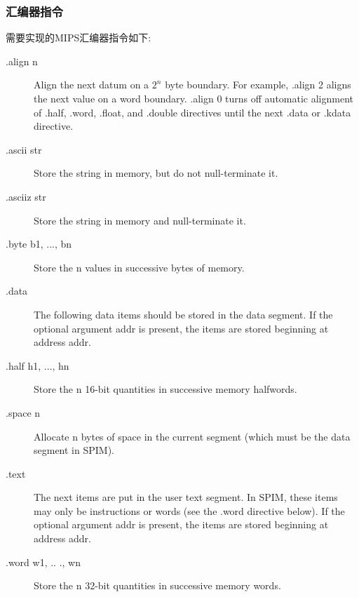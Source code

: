 \documentclass[a4paper, 11pt]{article}
\begin{document}
\subsubsection{汇编器指令}
	需要实现的MIPS汇编器指令如下:
	\begin{description}
		\item[.align n]
			Align the next datum on a $ 2^n $ byte boundary. For example, .align 2 aligns the next value on a word boundary. .align 0 turns off automatic alignment of .half, .word, .float, and .double directives until the next .data or .kdata directive.
		\item[.ascii str]
			Store the string in memory, but do not null-terminate it.
		\item[.asciiz str]
			Store the string in memory and null-terminate it.
		\item[.byte b1, ..., bn]
			Store the n values in successive bytes of memory.
		\item[.data]
			The following data items should be stored in the data segment. If the optional argument addr is present, the items are stored beginning at address addr.
		\item[.half h1, ..., hn]
			Store the n 16-bit quantities in successive memory halfwords.
		\item[.space n]
			Allocate n bytes of space in the current segment (which must be the data segment in SPIM).
		\item[.text]
			The next items are put in the user text segment. In SPIM, these items may only be instructions or words (see the .word directive below). If the optional argument addr is present, the items are stored beginning at address addr.
		\item[.word w1, ..	., wn]
Store the n 32-bit quantities in successive memory words.
	\end{description}
\end{document}
